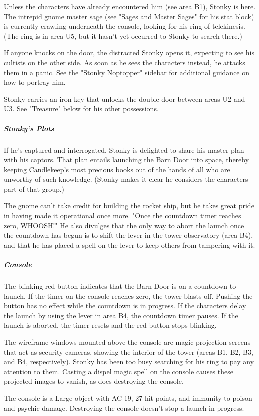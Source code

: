 \documentclass[10pt,a4paper,twoside,bg=print,twocolumn,openany,nodeprecatedcode]{dndbook}
\begin{document}
Unless the characters have already encountered him (see area B1), Stonky is here. The intrepid gnome master sage (see "Sages and Master Sages" for his stat block) is currently crawling underneath the console, looking for his ring of telekinesis. (The ring is in area U5, but it hasn't yet occurred to Stonky to search there.)

If anyone knocks on the door, the distracted Stonky opens it, expecting to see his cultists on the other side. As soon as he sees the characters instead, he attacks them in a panic. See the "Stonky Noptopper" sidebar for additional guidance on how to portray him.

Stonky carries an iron key that unlocks the double door between areas U2 and U3. See "Treasure" below for his other possessions.

\subparagraph{Stonky's Plots}
If he's captured and interrogated, Stonky is delighted to share his master plan with his captors. That plan entails launching the Barn Door into space, thereby keeping Candlekeep's most precious books out of the hands of all who are unworthy of such knowledge. (Stonky makes it clear he considers the characters part of that group.)

The gnome can't take credit for building the rocket ship, but he takes great pride in having made it operational once more. "Once the countdown timer reaches zero, WHOOSH!" He also divulges that the only way to abort the launch once the countdown has begun is to shift the lever in the tower observatory (area B4), and that he has placed a spell on the lever to keep others from tampering with it.

\subparagraph{Console}
The blinking red button indicates that the Barn Door is on a countdown to launch. If the timer on the console reaches zero, the tower blasts off. Pushing the button has no effect while the countdown is in progress. If the characters delay the launch by using the lever in area B4, the countdown timer pauses. If the launch is aborted, the timer resets and the red button stops blinking.

The wireframe windows mounted above the console are magic projection screens that act as security cameras, showing the interior of the tower (areas B1, B2, B3, and B4, respectively). Stonky has been too busy searching for his ring to pay any attention to them. Casting a dispel magic spell on the console causes these projected images to vanish, as does destroying the console.

The console is a Large object with AC 19, 27 hit points, and immunity to poison and psychic damage. Destroying the console doesn't stop a launch in progress.
\end{document}
